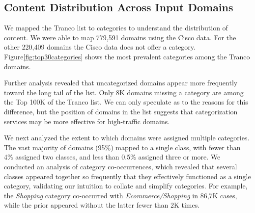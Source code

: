 \subsection{Content Distribution Across Input Domains}
\label{sec:dataset:tranco_categories}

We mapped the Tranco list to categories to understand the distribution of content.
We were able to map 779,591 domains using the Cisco data. For the other 220,409 domains the Cisco data
does not offer a category.
Figure\ref{fig:top30categories} shows the most prevalent categories among the Tranco domains.

Further analysis revealed that uncategorized domains appear more frequently
toward the long tail of the list. Only 8K domains missing a category are among
the Top 100K of the Tranco list.  We can only speculate as to the reasons for
this difference, but the position of domains in the list suggests that
categorization services may be more effective for high-traffic domains.


We next analyzed the extent to which domains were assigned multiple categories.
The vast majority of domains (95\%) mapped to a single class, with fewer than
4\% assigned two classes, and less than 0.5\% assigned three or more.
We conducted an analysis of category co-occurrences, which revealed that
several classes appeared together so frequently that they effectively
functioned as a single category, validating our intuition to collate and simplify categories.
For example, the \emph{Shopping} category co-occurred with
\emph{Ecommerce/Shopping} in 86,7K cases, while the prior appeared without the
latter fewer than 2K times.

